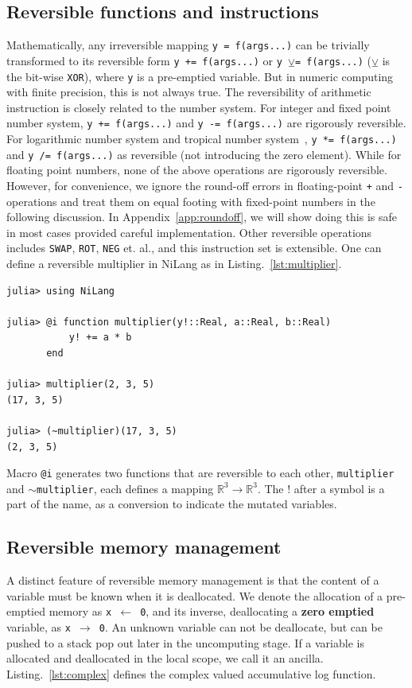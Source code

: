 \documentclass{article}
\newcommand{\<}{\langle}
\renewcommand{\>}{\rangle}
\renewcommand{\cite}[1]{{\citep{#1}}}
\newcommand{\Lst}[1]{Listing.~\ref{#1}}
\newcommand{\App}[1]{Appendix~\ref{#1}}
\theoremstyle{definition}\newtheorem{definition}{\textit{Definition}}
\begin{document}
\subsection{Reversible functions and instructions}
    Mathematically, any irreversible mapping \texttt{y = f(args...)} can be trivially transformed to its reversible form \texttt{y += f(args...)} or \texttt{y $\veebar$= f(args...)} ($\veebar$ is the bit-wise \texttt{XOR}), where \texttt{y} is a pre-emptied variable. But in numeric computing with finite precision, this is not always true. The reversibility of arithmetic instruction is closely related to the number system.
    For integer and fixed point number system, \texttt{y += f(args...)} and \texttt{y -= f(args...)} are rigorously reversible. For logarithmic number system and tropical number system~\cite{Speyer2009}, \texttt{y *= f(args...)} and \texttt{y /= f(args...)} as reversible (not introducing the zero element). While for floating point numbers, none of the above operations are rigorously reversible.
    However, for convenience, we ignore the round-off errors in floating-point \texttt{+} and \texttt{-} operations and treat them on equal footing with fixed-point numbers in the following discussion. In \App{app:roundoff}, we will show doing this is safe in most cases provided careful implementation.
Other reversible operations includes \texttt{SWAP}, \texttt{ROT}, \texttt{NEG} et. al., and this instruction set is extensible.
One can define a reversible multiplier in NiLang as in \Lst{lst:multiplier}.

\begin{minipage}{.88\columnwidth}
\begin{lstlisting}[mathescape=true,caption={A reversible multiplier},label={lst:multiplier}]
julia> using NiLang

julia> @i function multiplier(y!::Real, a::Real, b::Real)
           y! += a * b
       end

julia> multiplier(2, 3, 5)
(17, 3, 5)

julia> (~multiplier)(17, 3, 5)
(2, 3, 5)
\end{lstlisting}
\end{minipage}

Macro \texttt{@i} generates two functions that are reversible to each other, \texttt{multiplier} and \texttt{$\sim$multiplier}, each defines a mapping $\mathbb{R}^3 \rightarrow \mathbb{R}^3$. The $!$ after a symbol is a part of the name, as a conversion to indicate the mutated variables.

\subsection{Reversible memory management}
A distinct feature of reversible memory management is that the content of a variable must be known when it is deallocated.
We denote the allocation of a pre-emptied memory as \texttt{x $\leftarrow$ 0}, and its inverse, deallocating a \textbf{zero emptied} variable, as \texttt{x $\rightarrow$ 0}.
An unknown variable can not be deallocate, but can be pushed to a stack pop out later in the uncomputing stage.
If a variable is allocated and deallocated in the local scope, we call it an ancilla.
\Lst{lst:complex} defines the complex valued accumulative log function.
\end{document}
